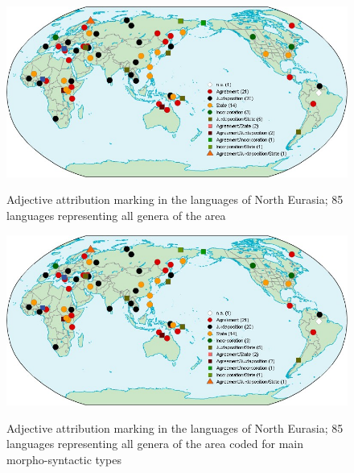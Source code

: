 \newpage
\begin{figure}
    \begin{minipage}[b][8cm][c]{2\baselineskip}
        \caption[Adjective attribution marking, North Eurasia]{Adjective attribution marking in the languages of North Eurasia; 85 languages representing all genera of the area}
    \end{minipage}
\includegraphics[width=\textheight,angle=90]{figures/WorldMapTyp.jpg}%
\label{NEMap}
\end{figure}

\newpage
\begin{figure}
    \begin{minipage}[b][8cm][c]{2\baselineskip}
        \caption[Adjective attribution marking, North Eurasia, main types]{Adjective attribution marking in the languages of North Eurasia; 85 languages representing all genera of the area coded for main morpho-syntactic types}
    \end{minipage}
\includegraphics[width=\textheight,angle=90]{figures/WorldMapTyp.jpg}%
\label{NEMapTyp}
\end{figure}

